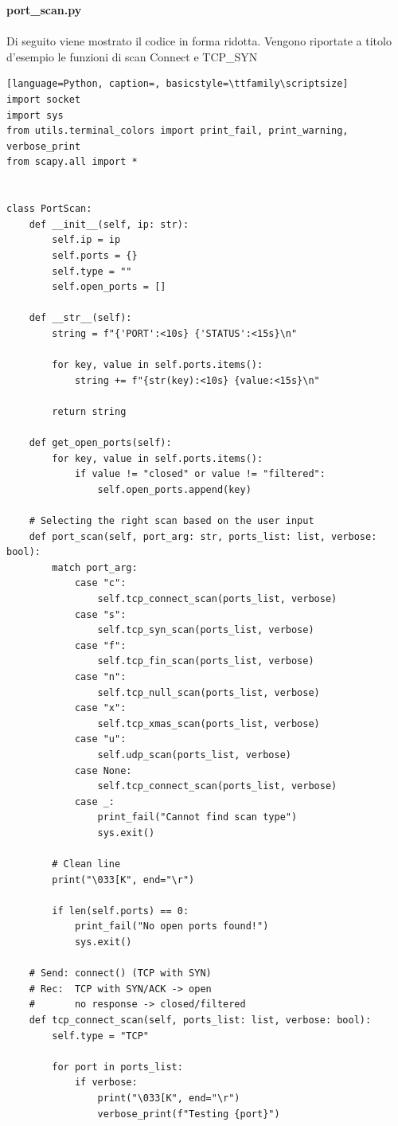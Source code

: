 \documentclass[12pt]{report}
\begin{document}
\newpage
\noindent
\textbf{port\_scan.py}
\\\\
Di seguito viene mostrato il codice in forma ridotta. Vengono riportate a titolo d'esempio le funzioni di scan Connect e TCP\_SYN 
\begin{lstlisting}[language=Python, caption=, basicstyle=\ttfamily\scriptsize]
import socket
import sys
from utils.terminal_colors import print_fail, print_warning, verbose_print
from scapy.all import *


class PortScan:
    def __init__(self, ip: str):
        self.ip = ip
        self.ports = {}
        self.type = ""
        self.open_ports = []

    def __str__(self):
        string = f"{'PORT':<10s} {'STATUS':<15s}\n"

        for key, value in self.ports.items():
            string += f"{str(key):<10s} {value:<15s}\n"

        return string

    def get_open_ports(self):
        for key, value in self.ports.items():
            if value != "closed" or value != "filtered":
                self.open_ports.append(key)

    # Selecting the right scan based on the user input
    def port_scan(self, port_arg: str, ports_list: list, verbose: bool):
        match port_arg:
            case "c":
                self.tcp_connect_scan(ports_list, verbose)
            case "s":
                self.tcp_syn_scan(ports_list, verbose)
            case "f":
                self.tcp_fin_scan(ports_list, verbose)
            case "n":
                self.tcp_null_scan(ports_list, verbose)
            case "x":
                self.tcp_xmas_scan(ports_list, verbose)
            case "u":
                self.udp_scan(ports_list, verbose)
            case None:
                self.tcp_connect_scan(ports_list, verbose)
            case _:
                print_fail("Cannot find scan type")
                sys.exit()

        # Clean line
        print("\033[K", end="\r")

        if len(self.ports) == 0:
            print_fail("No open ports found!")
            sys.exit()

    # Send: connect() (TCP with SYN)
    # Rec:  TCP with SYN/ACK -> open
    #       no response -> closed/filtered
    def tcp_connect_scan(self, ports_list: list, verbose: bool):
        self.type = "TCP"

        for port in ports_list:
            if verbose:
                print("\033[K", end="\r")
                verbose_print(f"Testing {port}")


\end{lstlisting}
\end{document}
